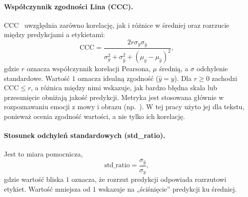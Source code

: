 \paragraph{Współczynnik zgodności Lina (CCC).}
CCC~\cite{lin1989ccc} uwzględnia zarówno korelację, jak i różnice w średniej
oraz rozrzucie między predykcjami a etykietami:
\begin{equation}
  \mathrm{CCC} = \frac{2 r \sigma_y \sigma_{\hat{y}}}
                      {\sigma_y^2 + \sigma_{\hat{y}}^2 + (\mu_y - \mu_{\hat{y}})^2},
\end{equation}
gdzie $r$ oznacza współczynnik korelacji Pearsona, $\mu$ średnią, a $\sigma$
odchylenie standardowe. Wartość $1$ oznacza idealną zgodność ($\hat{y} = y$).
Dla $r \ge 0$ zachodzi $\mathrm{CCC} \le r$, a różnica między nimi wskazuje, jak
bardzo błędna skala lub przesunięcie obniżają jakość predykcji. Metryka jest
stosowana głównie w rozpoznawaniu emocji z mowy i obrazu (np.~\cite{valstar2016avec2016depression}).
W tej pracy użyto jej dla tekstu, ponieważ ocenia zgodność wartości, a nie tylko
ich korelację.

\paragraph{Stosunek odchyleń standardowych (std\_ratio).}
Jest to miara pomocnicza,
\begin{equation}
  \text{std\_ratio} = \frac{\sigma_{\hat{y}}}{\sigma_y},
\end{equation}
gdzie wartość bliska $1$ oznacza, że rozrzut predykcji odpowiada 
rozrzutowi etykiet. Wartość mniejsza od $1$ wskazuje na „ściśnięcie” predykcji ku średniej.

